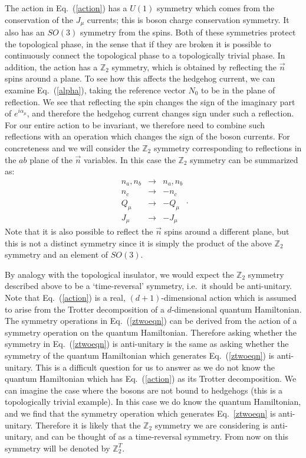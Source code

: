 \documentclass[prb,twocolumn]{revtex4-1}
\def\ztwo{\mathbb{Z}_2}
\def\ztwot{\mathbb{Z}_2^T}
\begin{document}
The action in Eq.~(\ref{action}) has a $U(1)$ symmetry which comes from the conservation of the $J_\mu$ currents; this is boson charge conservation symmetry. It also has an $SO(3)$ symmetry from the spins. Both of these symmetries protect the topological phase, in the sense that if they are broken it is possible to continuously connect the topological phase to a topologically trivial phase.
In addition, the action has 
a $\ztwo$ symmetry, which is obtained by reflecting the $\vec{n}$ spins around a plane. To see how this affects the hedgehog current, we can examine Eq.~(\ref{alpha}), taking the reference vector $N_0$ to be in the plane of reflection. We see that reflecting the spin changes the sign of the imaginary part of $e^{i\alpha_\mu}$, and therefore the hedgehog current changes sign under such a reflection. For our entire action to be invariant, we therefore need to combine such reflections with an operation which changes the sign of the boson currents. For concreteness and we will consider the $\ztwo$ symmetry corresponding to reflections in the $ab$ plane of the $\vec{n}$ variables. In this case the $\ztwo$ symmetry can be summarized as:
\begin{equation}
\begin{array}{ccc}
n_a,n_b & \rightarrow & n_a,n_b \\
n_c & \rightarrow & -n_c\\
Q_\mu & \rightarrow & -Q_\mu\\
J_\mu & \rightarrow & -J_\mu 
\end{array}.
\label{ztwoeqn}
\end{equation}
Note that it is also possible to reflect the $\vec n$ spins around a different plane, but this is not a distinct symmetry since it is simply the product of the above $\ztwo$ symmetry and an element of $SO(3)$. 

By analogy with the topological insulator, we would expect the $\ztwo$ symmetry described above to be a `time-reversal' symmetry, i.e.~it should be anti-unitary. Note that Eq.~(\ref{action}) is a real, $(d+1)$-dimensional action which is assumed to arise from the Trotter decomposition of a $d$-dimensional quantum Hamiltonian. The symmetry operations in Eq.~(\ref{ztwoeqn}) can be derived from the action of a symmetry operation on the quantum Hamiltonian. Therefore asking whether the symmetry in Eq.~(\ref{ztwoeqn}) is anti-unitary is the same as asking whether the symmetry of the quantum Hamiltonian which generates Eq.~(\ref{ztwoeqn}) is anti-unitary. This is a difficult question for us to answer as we do not know the quantum Hamiltonian which has Eq.~(\ref{action}) as its Trotter decomposition. We can imagine the case where the bosons are not bound to hedgehogs (this is a topologically trivial example). In this case we do know the quantum Hamiltonian, and we find that the symmetry operation which generates Eq.~\ref{ztwoeqn} is anti-unitary. Therefore it is likely that the $\ztwo$ symmetry we are considering is anti-unitary, and can be thought of as a time-reversal symmetry. From now on this symmetry will be denoted by $\ztwot$.
\end{document}
